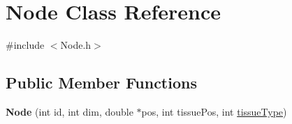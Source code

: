 \hypertarget{classNode}{}\section{Node Class Reference}
\label{classNode}


{\ttfamily \#include $<$Node.\+h$>$}

\subsection*{Public Member Functions}
\begin{DoxyCompactItemize}
\item 
\hypertarget{classNode_ac84926c5a9cf2883665f00382781b932}{}{\bfseries Node} (int id, int dim, double $\ast$pos, int tissue\+Pos, int \hyperlink{classNode_ae621097f98f1d33d283cf65a0a02d29a}{tissue\+Type})\label{classNode_ac84926c5a9cf2883665f00382781b932}


\end{DoxyCompactItemize}
